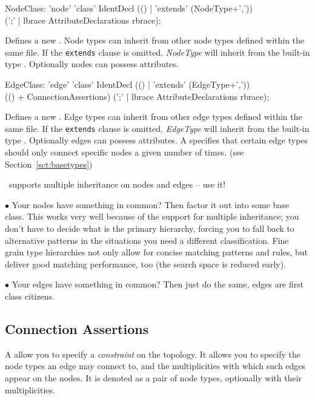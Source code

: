 \begin{rail}
  NodeClass: 'node' 'class' IdentDecl (() | 'extends' (NodeType+',')) \\
    (';' | lbrace AttributeDeclarations rbrace);
\end{rail}
Defines a new . Node types can inherit from other node types defined within the same file. If the \texttt{extends} clause is omitted, \emph{NodeType} will inherit from the built-in type \texttt{}. Optionally nodes can possess attributes.

\begin{rail}
  EdgeClass: 'edge' 'class' IdentDecl (() | 'extends' (EdgeType+',')) \\
    (() + ConnectionAssertions) (';' | lbrace AttributeDeclarations rbrace);
\end{rail}
Defines a new .
Edge types can inherit from other edge types defined within the same file.
If the \texttt{extends} clause is omitted, \emph{EdgeType} will inherit from the built-in type \texttt{}.
Optionally edges can possess attributes.
A  specifies that certain edge types should only connect specific nodes a given number of times.
(see Section~\ref{sct:basetypes})

\begin{note}
\GrG~supports multiple inheritance on nodes and edges -- use it!

$\bullet$ Your nodes have something in common?
Then factor it out into some base class.
This works very well because of the support for multiple inheritance; you don't have to decide what is the primary hierarchy, forcing you to fall back to alternative patterns in the situations you need a different classification.
Fine grain type hierarchies not only allow for concise matching patterns and rules,
but deliver good matching performance, too (the search space is reduced early).

$\bullet$ Your edges have something in common?
Then just do the same, edges are first class citizens.
\end{note}

\pagebreak

\subsection*{Connection Assertions}
A \emph{} allow you to specify a \emph{constraint} on the topology.
It allows you to specify the node types an edge may connect to, and the multiplicities with which such edges appear on the nodes.
It is denoted as a pair of node types, optionally with their multiplicities.

